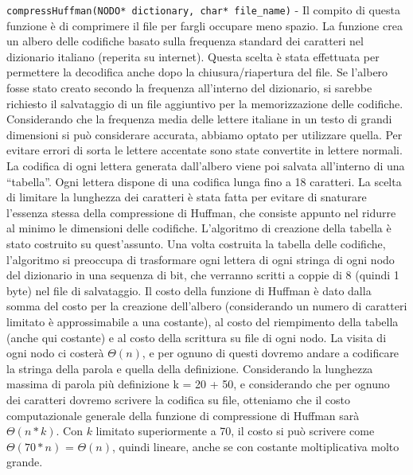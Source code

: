 \documentclass[paper=a4, fontsize=11pt,twoside]{scrartcl}   %
\begin{document}
				\texttt{compressHuffman(NODO* dictionary, char* file\_name)} - Il compito di questa funzione è di comprimere il file per fargli occupare meno spazio. La funzione crea un albero delle codifiche basato sulla frequenza standard dei caratteri nel dizionario italiano (reperita su internet). Questa scelta è stata effettuata per permettere la decodifica anche dopo la chiusura/riapertura del file. Se l’albero fosse stato creato secondo la frequenza all’interno del dizionario, si sarebbe richiesto il salvataggio di un file aggiuntivo per la memorizzazione delle codifiche. Considerando che la frequenza media delle lettere italiane in un testo di grandi dimensioni si può considerare accurata, abbiamo optato per utilizzare quella. Per evitare errori di sorta le lettere accentate sono state convertite in lettere normali.
				La codifica di ogni lettera generata dall’albero viene poi salvata all’interno di una “tabella”. Ogni lettera dispone di una codifica lunga fino a 18 caratteri. La scelta di limitare la lunghezza dei caratteri è stata fatta per evitare di snaturare l’essenza stessa della compressione di Huffman, che consiste appunto nel ridurre al minimo le dimensioni delle codifiche. L’algoritmo di creazione della tabella è stato costruito su quest’assunto. 
				Una volta costruita la tabella delle codifiche, l’algoritmo si preoccupa di trasformare ogni lettera di ogni stringa di ogni nodo del dizionario in una sequenza di bit, che verranno scritti a coppie di 8 (quindi 1 byte) nel file di salvataggio. 
				Il costo della funzione di Huffman è dato dalla somma del costo per la creazione dell’albero (considerando un numero di caratteri limitato è approssimabile a una costante), al costo del riempimento della tabella (anche qui costante) e al costo della scrittura su file di ogni nodo. La visita di ogni nodo ci costerà $\Theta(n)$, e per ognuno di questi dovremo andare a codificare la stringa della parola e quella della definizione. Considerando la lunghezza massima di parola più definizione k = 20 + 50, e considerando che per ognuno dei caratteri dovremo scrivere la codifica su file, otteniamo che il costo computazionale generale della funzione di compressione di Huffman sarà $\Theta(n*k)$. Con $k$ limitato superiormente a 70, il costo si può scrivere come $\Theta(70*n)$ = $\Theta(n)$, quindi lineare, anche se con costante moltiplicativa molto grande.\par 
				
\end{document}
